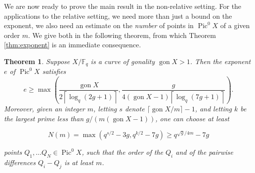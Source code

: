 \documentclass[11pt]{amsart}
\newcommand{\F}{\mathbb{F}}
\DeclareMathOperator{\Pic}{Pic}
\newcommand{\gon}{\operatorname{gon}}
\newtheorem{theorem}{Theorem}[section]
\theoremstyle{definition}
\theoremstyle{remark}
\begin{document}
We are now ready to prove the main result in the non-relative setting. For the applications to the relative setting, we need more than just a bound on the exponent, we also need an estimate on the \emph{number} of points in $\Pic^0 X$ of a given order $m$. We give both in the following theorem, from which Theorem \ref{thm:exponent} is an immediate consequence.
\begin{theorem}\label{thm:mainfull}
    Suppose $X/\F_q$ is a curve of gonality $\gon X>1$. Then the exponent $e$ of $\Pic^0 X$ satisfies
    \[e \geqslant \max\left(\frac{\gon X}{2\left\lceil\log_q (2g+1)\right\rceil}, \frac{g}{4(\gon X -1)\left\lceil\log_q(7g+1)\right\rceil}\right).\]
Moreover, given an integer $m$, letting $s$ denote $\lceil\gon X / m\rceil - 1$, and letting $k$ be the largest prime less than $g/(m(\gon X -1))$, one can choose at least 

\[N(m)=\max \left(q^{s/2}-3g, q^{k/2}-7g \right) \geqslant q^{\sqrt{g}/4m} - 7g\]

points $Q_1, \dots Q_N\in \Pic^0 X$, such that the order of the $Q_i$ and of the pairwise differences $Q_i-Q_j$ is at least $m$.
\end{theorem}
\end{document}
